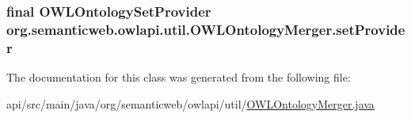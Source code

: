 \hypertarget{classorg_1_1semanticweb_1_1owlapi_1_1util_1_1_o_w_l_ontology_merger_a43e29f791c8384993cba9ffc61390c0b}{
\subsubsection[{set\-Provider}]{\setlength{\rightskip}{0pt plus 5cm}final {\bf O\-W\-L\-Ontology\-Set\-Provider} org.\-semanticweb.\-owlapi.\-util.\-O\-W\-L\-Ontology\-Merger.\-set\-Provider\hspace{0.3cm}{\ttfamily [private]}}}\label{classorg_1_1semanticweb_1_1owlapi_1_1util_1_1_o_w_l_ontology_merger_a43e29f791c8384993cba9ffc61390c0b}


The documentation for this class was generated from the following file\-:\begin{DoxyCompactItemize}
\item 
api/src/main/java/org/semanticweb/owlapi/util/\hyperlink{_o_w_l_ontology_merger_8java}{O\-W\-L\-Ontology\-Merger.\-java}\end{DoxyCompactItemize}

